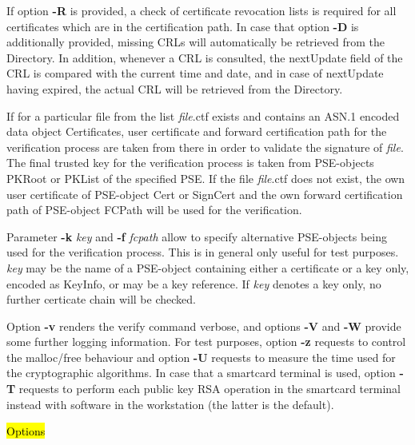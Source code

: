 If option {\bf -R} is provided, a check of certificate revocation lists is required for all certificates
which are in the certification path. In case that option {\bf -D} is additionally provided, missing CRLs will
automatically be retrieved from the Directory. In addition, whenever a CRL is consulted, the 
nextUpdate field of the CRL is compared with the current time and date, and in case of nextUpdate
having expired, the actual CRL will be retrieved from the Directory.

If for a particular file from the list {\em file}.ctf exists and contains an ASN.1 encoded data object Certificates, 
user certificate and forward 
certification path for the verification process are taken from there in order to validate the signature
of {\em file}. The final trusted key for 
the verification process is taken from PSE-objects PKRoot or PKList of the specified PSE.
If the file {\em file}.ctf does not exist, the own user certificate of PSE-object Cert or SignCert and
the own forward certification path of PSE-object FCPath will be used for the verification.

Parameter {\bf -k} {\em key} and {\bf -f} {\em fcpath} allow to specify 
alternative PSE-objects being used for the verification process. This is in general only useful for
test purposes. {\em key} may be the name of a PSE-object containing either a certificate
or a key only, encoded as KeyInfo, or may be a key reference. If {\em key} denotes a key only,
no further certicate chain will be checked.

Option {\bf -v} renders the verify command verbose, and options {\bf -V} and {\bf -W} provide some
further logging information. For test purposes, option {\bf -z} requests
to control the malloc/free behaviour and option {\bf -U} requests to measure the time used for the 
cryptographic
algorithms. In case that a smartcard terminal is used, option {\bf -T} requests to perform each public key 
RSA operation in the smartcard terminal instead with software in the workstation (the latter is the 
default). 

 
\hl{Options}



